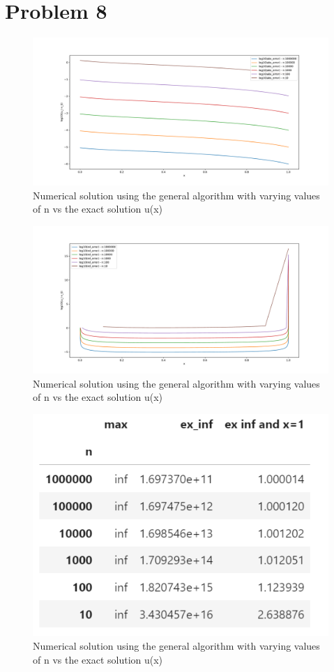\documentclass[english,notitlepage]{revtex4-1}  %
\begin{document}
\section{Problem 8}

\begin{figure}
	\centering
	\includegraphics[scale=0.5]{../Figures/problem8_abs_error.pdf}
	\caption{Numerical solution using the general algorithm with varying values of n vs the exact solution u(x)}
\end{figure}
\begin{figure}
	\centering
	\includegraphics[scale=0.5]{../Figures/problem8_rel_error.pdf}
	\caption{Numerical solution using the general algorithm with varying values of n vs the exact solution u(x)}
\end{figure}
\begin{figure}
	\centering
	\includegraphics[scale=1]{../Figures/problem8_table.pdf}
	\caption{Numerical solution using the general algorithm with varying values of n vs the exact solution u(x)}
\end{figure}
\end{document}
